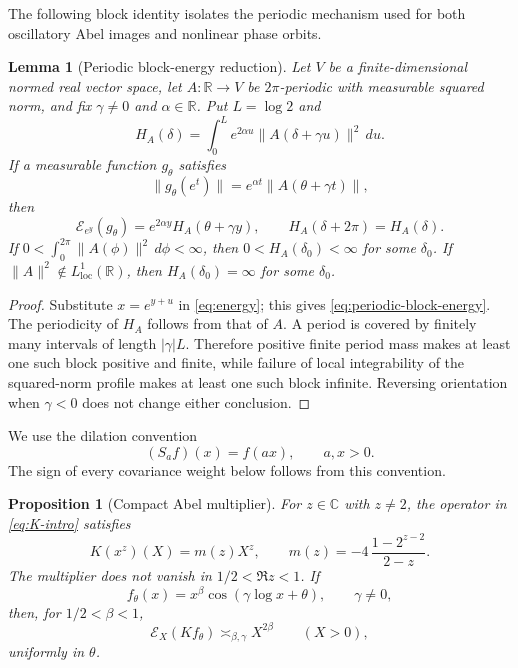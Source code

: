 \documentclass[11pt,a4paper]{amsart}
\newtheorem{proposition}[theorem]{Proposition}
\newtheorem{lemma}[theorem]{Lemma}
\theoremstyle{definition}
\newcommand{\R}{\mathbb R}
\newcommand{\C}{\mathbb C}
\newcommand{\norm}[1]{\lVert #1\rVert}
\newcommand{\cE}{\mathcal E}
\begin{document}
The following block identity isolates the periodic mechanism used for both
oscillatory Abel images and nonlinear phase orbits.

\begin{lemma}[Periodic block-energy reduction]\label{lem:periodic-block}
Let $V$ be a finite-dimensional normed real vector space, let
$A:\R\to V$ be $2\pi$-periodic with measurable squared norm, and fix
$\gamma\ne0$ and $\alpha\in\R$.  Put $L=\log2$ and
\begin{equation}\label{eq:periodic-block-profile}
 H_A(\delta)=\int_0^L e^{2\alpha u}
  \norm{A(\delta+\gamma u)}^2\,du.
\end{equation}
If a measurable function $g_\theta$ satisfies
\[
 \norm{g_\theta(e^t)}
 =e^{\alpha t}\norm{A(\theta+\gamma t)},
\]
then
\begin{equation}\label{eq:periodic-block-energy}
 \cE_{e^y}(g_\theta)
 =e^{2\alpha y}H_A(\theta+\gamma y),
 \qquad H_A(\delta+2\pi)=H_A(\delta).
\end{equation}
If $0<\int_0^{2\pi}\norm{A(\phi)}^2\,d\phi<\infty$, then
$0<H_A(\delta_0)<\infty$ for some $\delta_0$.  If
$\norm{A}^2\notin L^1_{\mathrm{loc}}(\R)$, then
$H_A(\delta_0)=\infty$ for some $\delta_0$.
\end{lemma}

\begin{proof}
Substitute $x=e^{y+u}$ in \eqref{eq:energy}; this gives
\eqref{eq:periodic-block-energy}.  The periodicity of $H_A$ follows from that
of $A$.  A period is covered by finitely many intervals of length
$|\gamma|L$.  Therefore positive finite period mass makes at least one such
block positive and finite, while failure of local integrability of the
squared-norm profile makes
at least one such block infinite.  Reversing orientation when $\gamma<0$
does not change either conclusion.
\end{proof}

We use the dilation convention
\begin{equation}\label{eq:dilation}
  (S_af)(x)=f(ax),\qquad a,x>0.
\end{equation}
The sign of every covariance weight below follows from this convention.

\begin{proposition}[Compact Abel multiplier]\label{prop:Abel}
For $z\in\C$ with $z\ne2$, the operator in \eqref{eq:K-intro} satisfies
\begin{equation}\label{eq:Abel-multiplier}
  K(x^z)(X)=m(z)X^z,
  \qquad
  m(z)=-4\,\frac{1-2^{z-2}}{2-z}.
\end{equation}
The multiplier does not vanish in $1/2<\Re z<1$.  If
\[
 f_\theta(x)=x^\beta\cos(\gamma\log x+\theta),
 \qquad \gamma\ne0,
\]
then, for $1/2<\beta<1$,
\begin{equation}\label{eq:Abel-phase-energy}
  \cE_X(Kf_\theta)\asymp_{\beta,\gamma}X^{2\beta}
  \qquad(X>0),
\end{equation}
uniformly in $\theta$.
\end{proposition}
\end{document}

